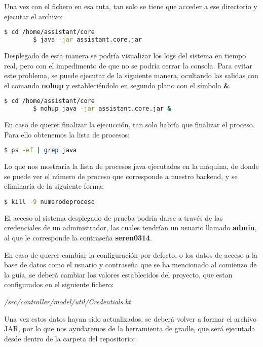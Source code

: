     Una vez con el fichero en esa ruta, tan solo se tiene que acceder a ese directorio y ejecutar el archivo:
    \begin{lstlisting}[language=bash]
        $ cd /home/assistant/core
        $ java -jar assistant.core.jar
    \end{lstlisting}
    
    Desplegado de esta manera se podría visualizar los logs del sistema en tiempo real, pero con el impedimento de que no se podría cerrar la consola. Para evitar este problema, se puede ejecutar de la siguiente manera, ocultando las salidas con el comando \textbf{nohup} y estableciéndolo en segundo plano con el símbolo \textbf{\&}
        \begin{lstlisting}[language=bash]
        $ cd /home/assistant/core
        $ nohup java -jar assistant.core.jar &
    \end{lstlisting}
    
    En caso de querer finalizar la ejecucción, tan solo habría que finalizar el proceso. Para ello obtenemos la lista de procesos:
    
    \begin{lstlisting}[language=bash]
        $ ps -ef | grep java
    \end{lstlisting}
    
    Lo que nos mostraría la lista de procesos java ejecutados en la máquina, de donde se puede ver el número de proceso que corresponde a nuestro backend, y se eliminaría de la siguiente forma:

    \begin{lstlisting}[language=bash]
        $ kill -9 numerodeproceso
    \end{lstlisting}
    
    El acceso al sistema desplegado de prueba podría darse a través de las credenciales de un administrador, las cuales tendrían un usuario llamado \textbf{admin}, al que le corresponde la contraseña \textbf{seren0314}. 
    
    En caso de querer cambiar la configuración por defecto, o los datos de acceso a la base de datos como el usuario y contraseña que se ha mencionado al comienzo de la guía, se deberá cambiar los valores establecidos del proyecto, que estan configurados en el siguiente fichero:
    
    \textit{/src/controller/model/util/Credentials.kt}
    
    Una vez estos datos hayan sido actualizados, se deberá volver a formar el archivo JAR, por lo que nos ayudaremos de la herramienta de gradle, que será ejecutada desde dentro de la carpeta del repositorio:
    
